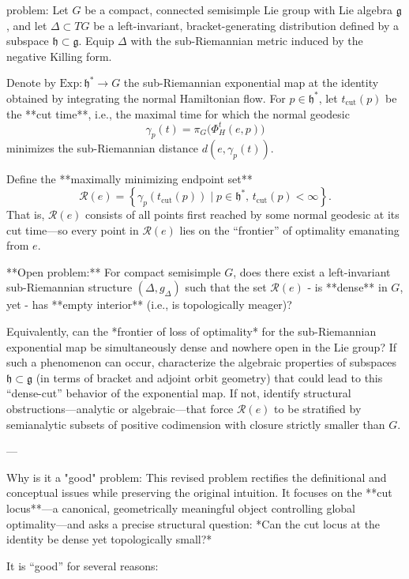 problem:  
Let \(G\) be a compact, connected semisimple Lie group with Lie algebra \(\mathfrak{g}\), and let \(\Delta\subset TG\) be a left-invariant, bracket-generating distribution defined by a subspace \(\mathfrak{h}\subset\mathfrak{g}\).  
Equip \(\Delta\) with the sub-Riemannian metric induced by the negative Killing form.  

Denote by \(\mathrm{Exp}:\mathfrak{h}^*\to G\) the sub-Riemannian exponential map at the identity obtained by integrating the normal Hamiltonian flow. For \(p\in\mathfrak{h}^*\), let \(t_{\mathrm{cut}}(p)\) be the **cut time**, i.e., the maximal time for which the normal geodesic
\[
\gamma_p(t)=\pi_G\!\big(\Phi_H^t(e,p)\big)
\]
minimizes the sub-Riemannian distance \(d(e,\gamma_p(t))\).

Define the **maximally minimizing endpoint set**
\[
\mathcal{R}(e)=\left\{\gamma_p(t_{\mathrm{cut}}(p)) \mid p\in\mathfrak{h}^*,\, t_{\mathrm{cut}}(p)<\infty \right\}.
\]
That is, \(\mathcal{R}(e)\) consists of all points first reached by some normal geodesic at its cut time—so every point in \(\mathcal{R}(e)\) lies on the “frontier” of optimality emanating from \(e\).

**Open problem:**  
For compact semisimple \(G\), does there exist a left-invariant sub-Riemannian structure \((\Delta,g_\Delta)\) such that the set \(\mathcal{R}(e)\)
- is **dense** in \(G\), yet  
- has **empty interior** (i.e., is topologically meager)?  

Equivalently, can the *frontier of loss of optimality* for the sub-Riemannian exponential map be simultaneously dense and nowhere open in the Lie group?  
If such a phenomenon can occur, characterize the algebraic properties of subspaces \(\mathfrak{h}\subset\mathfrak{g}\) (in terms of bracket and adjoint orbit geometry) that could lead to this “dense-cut” behavior of the exponential map.  
If not, identify structural obstructions—analytic or algebraic—that force \(\mathcal{R}(e)\) to be stratified by semianalytic subsets of positive codimension with closure strictly smaller than \(G\).

---

Why is it a "good" problem:  
This revised problem rectifies the definitional and conceptual issues while preserving the original intuition. It focuses on the **cut locus**—a canonical, geometrically meaningful object controlling global optimality—and asks a precise structural question: *Can the cut locus at the identity be dense yet topologically small?*

It is “good” for several reasons:

